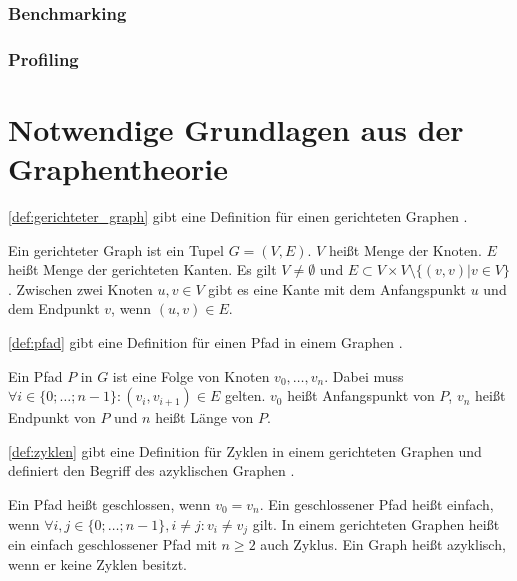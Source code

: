 \subsubsection*{Benchmarking}
\subsubsection*{Profiling}


\section{Notwendige Grundlagen aus der Graphentheorie}
\label{sec:grundlagen_graphentheorie}

\autoref{def:gerichteter_graph} gibt eine Definition für einen gerichteten
Graphen \autocite[vgl.][S.220]{AlgorithmenUndDatenstrukturen}.
\begin{definition}
    Ein gerichteter Graph ist ein Tupel $G=(V,E)$. $V$ heißt Menge der Knoten.
    $E$ heißt Menge der gerichteten Kanten. Es gilt $V\ne\emptyset$ und $E \subset V \times
    V \setminus \{(v,v) | v \in V\}$. Zwischen zwei Knoten $u,v \in V$ gibt es
    eine Kante mit dem Anfangspunkt $u$ und dem Endpunkt $v$, wenn $(u,v) \in E$.
    \label{def:gerichteter_graph}
\end{definition}

\autoref{def:pfad} gibt eine Definition für einen Pfad in einem Graphen
\autocite[vgl.][S.221f]{AlgorithmenUndDatenstrukturen}.
\begin{definition}
    Ein Pfad $P$ in $G$  ist eine Folge von Knoten $v_0, \dots ,v_n$. Dabei
    muss $\forall i \in \{0; \dots; n-1 \} : (v_i,v_{i+1}) \in E$ gelten. $v_0$
    heißt Anfangspunkt von $P$, $v_n$ heißt Endpunkt von $P$ und $n$ heißt
    Länge von $P$.
    \label{def:pfad}
\end{definition}

\autoref{def:zyklen} gibt  eine Definition für Zyklen in einem gerichteten
Graphen und definiert den Begriff des azyklischen Graphen
\autocite[vgl.][S.222]{AlgorithmenUndDatenstrukturen}.
\begin{definition}
    Ein Pfad heißt geschlossen, wenn $v_0 = v_n$. Ein
    geschlossener Pfad heißt einfach, wenn $\forall i,j \in \{0; \dots; n-1\}, i
    \ne j:v_i \ne v_j$ gilt. In einem gerichteten Graphen heißt ein einfach
    geschlossener Pfad mit $n\geq 2$ auch Zyklus. Ein Graph heißt azyklisch,
    wenn er keine Zyklen besitzt.
    \label{def:zyklen}
\end{definition}

